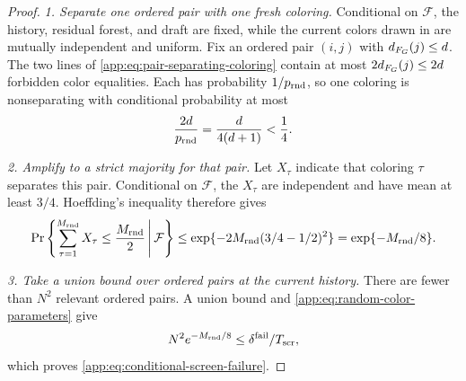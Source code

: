 \begin{proof}

\emph{1. Separate one ordered pair with one fresh coloring.}
Conditional on $\mathcal F$, the history, residual forest, and draft are fixed, while
the current colors drawn in  are mutually independent
and uniform.  Fix an ordered pair
$(i,j)$ with $d_{F_{G}}(j)\le d$.  The two lines of
\eqref{app:eq:pair-separating-coloring} contain at most
$2d_{F_{G}}(j)\le2d$ forbidden color equalities.  Each
has probability $1/p_{\mathrm{rnd}}$, so one coloring is nonseparating with
conditional probability at most
\begin{equation}
 \frac{2d}{p_{\mathrm{rnd}}}
 =\frac{d}{4(d+1)}<\frac14.
 \label{app:eq:one-random-coloring-bad}
\end{equation}

\emph{2. Amplify to a strict majority for that pair.}
Let $X_\tau$ indicate that coloring $\tau$ separates this pair.  Conditional
on $\mathcal F$, the $X_\tau$ are independent and have mean at least $3/4$.
Hoeffding's inequality therefore gives
\begin{equation}
 \Pr\left\{\sum_{\tau=1}^{M_{\mathrm{rnd}}}X_\tau
       \le\frac{M_{\mathrm{rnd}}}{2}\,\middle|\,\mathcal F\right\}
 \le \exp\{-2M_{\mathrm{rnd}}(3/4-1/2)^2\}
 =\exp\{-M_{\mathrm{rnd}}/8\}.
 \label{app:eq:random-majority-hoeffding}
\end{equation}

\emph{3. Take a union bound over ordered pairs at the current history.}
There are fewer than $N^2$ relevant ordered pairs.  A union bound and
\eqref{app:eq:random-color-parameters} give
\[
 N^2e^{-M_{\mathrm{rnd}}/8}
 \le\delta^{\mathrm{fail}}/T_{\mathrm{scr}},
\]
which proves \eqref{app:eq:conditional-screen-failure}.



\end{proof}
